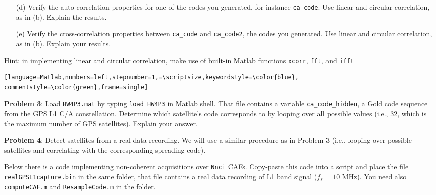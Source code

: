 \documentclass[11pt]{article}
\begin{document}
\begin{enumerate}
\item[(d)] Verify the auto-correlation properties for one of the codes you generated, for instance \verb|ca_code|. Use linear and circular correlation, as in (b). Explain the results.
\item[(e)] Verify the cross-correlation properties between \verb|ca_code| and \verb|ca_code2|, the codes you generated. Use linear and circular correlation, as in (b). Explain your results.
\end{enumerate}

Hint: in implementing linear and circular correlation, make use of built-in Matlab functions \verb|xcorr|, \verb|fft|, and \verb|ifft|

\begin{lstlisting}[language=Matlab,numbers=left,stepnumber=1,=\scriptsize,keywordstyle=\color{blue}, commentstyle=\color{green},frame=single]
\end{lstlisting}
\vspace*{.5cm}

\textbf{Problem 3}:
Load \verb|HW4P3.mat| by typing \verb|load HW4P3| in Matlab shell. That file contains a variable \verb|ca_code_hidden|, a Gold code sequence from the GPS L1 C/A constellation. Determine which satellite's code corresponds to by looping over all possible values (i.e., $32$, which is the maximum number of GPS satellites). Explain your answer.


\vspace*{.5cm}

\textbf{Problem 4}:
Detect satellites from a real data recording. We will use a similar procedure as in Problem 3 (i.e., looping over possible satellites and correlating with the corresponding spreading code). 

Below there is a code implementing non-coherent acquisitions over \verb|Nnci| CAFs. Copy-paste this code into a script and place the file \verb|realGPSL1capture.bin| in the same folder, that file contains a real data recording of L1 band signal ($f_s=10$ MHz). You need also \verb|computeCAF.m| and \verb|ResampleCode.m| in the folder.
\end{document}
